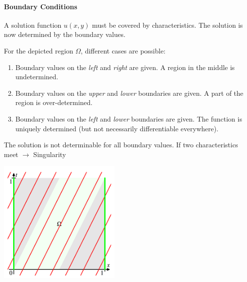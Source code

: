 \paragraph{Boundary Conditions}
A solution function $u(x,y)$ must be covered by characteristics.
The solution is now determined by the boundary values.

\begin{minipage}{10cm}
    For the depicted region $\Omega$, different cases are possible:
    \begin{enumerate}
        \item Boundary values on the \emph{left} and \emph{right} are given. A region in the middle is undetermined.
        \item Boundary values on the \emph{upper} and \emph{lower} boundaries are given. A part of the region is over-determined.
        \item Boundary values on the \emph{left} and \emph{lower} boundaries are given. The function is uniquely determined (but not necessarily differentiable everywhere).
    \end{enumerate}
    The solution is not determinable for all boundary values. \newline
    If two characteristics meet $\rightarrow$ Singularity
\end{minipage}
\hspace{0.5cm}
\begin{minipage}{8cm}
    \centering
    \includegraphics[width=6cm]{Content/01_theory/charakteristiken_randwerte.png}
\end{minipage}

